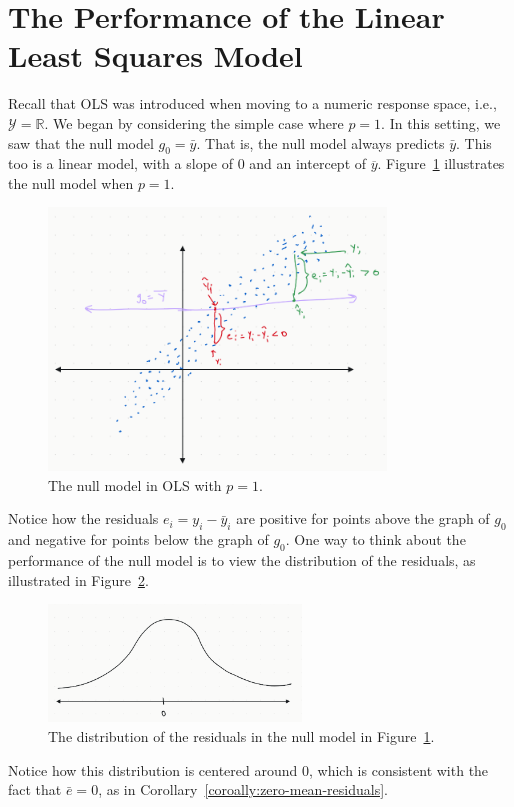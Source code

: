 \documentclass[12pt, a4paper]{article}
\theoremstyle{definition}
\begin{document}
	\section*{The Performance of the Linear Least Squares Model}
	Recall that OLS was introduced when moving to a numeric response space,
	i.e., $\mathcal{Y}=\mathbb{R}$. We began by considering the simple case
	where $p = 1$. In this setting, we saw that the null model $g_0=\bar{y}$.
	That is, the null model always predicts $\bar{y}$. This too is a linear
	model, with a slope of $0$ and an intercept of $\overline{y}$.
	Figure~\ref{fig:ols-null-model} illustrates the null model when $p=1$.
	\begin{figure}
		\centering
		\includegraphics[width=0.8\textwidth]{ols-null-model}
		\caption{The null model in OLS with $p=1$.}
		\label{fig:ols-null-model}
	\end{figure}
	Notice how the residuals $e_i=y_i-\bar{y}_i$ are positive for points above the graph of
	$g_0$ and negative for points below the graph of $g_0$. One way to think about
	the performance of the null model is to view the distribution of the residuals,
	as illustrated in Figure~\ref{fig:ols-null-model-residuals}.
	\begin{figure}
		\centering
		\includegraphics[width=0.6\textwidth]{ols-residuals-distribution-null-model}
		\caption{The distribution of the residuals in the null model in Figure~\ref{fig:ols-null-model}.}
		\label{fig:ols-null-model-residuals}
	\end{figure}
	Notice how this distribution is centered around $0$, which is consistent with the
	fact that $\bar{e} = 0$, as in Corollary~\ref{coroally:zero-mean-residuals}.
	
\end{document}
